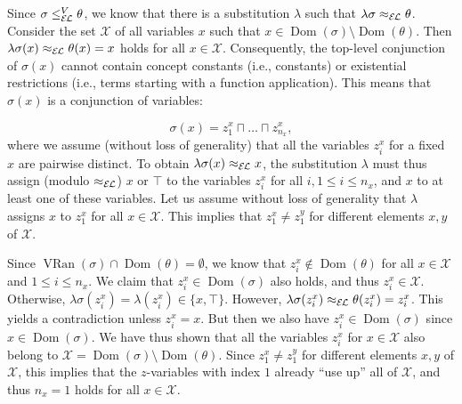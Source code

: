  
 
Since $\sigma\leq_{\mathcal{E\mkern-1.618muL}}^{V}\theta$, we know that there is a substitution $\lambda$ such that $\lambda\sigma\approx_{\mathcal{E\mkern-1.618muL}}\theta$. Consider the set $\mathcal{X}$ of all variables $x$ such that $x\in\operatorname{Dom}(\sigma)\setminus\operatorname{Dom}(\theta)$. Then $\lambda\sigma(x)\approx_{\mathcal{E\mkern-1.618muL}}\theta(x)=x$ holds for all $x\in\mathcal{X}$. Consequently, the top-level conjunction of $\sigma(x)$ cannot contain concept constants (i.e., constants) or existential restrictions (i.e., terms starting with a function application). This means that $\sigma(x)$ is a conjunction of variables:\par
    \[\sigma(x)=z_{1}^{x}\sqcap\ldots\sqcap z_{n_{x}}^{x},\]    
where we assume (without loss of generality) that all the variables $z_{i}^{x}$ for a fixed $x$ are pairwise distinct. To obtain $\lambda\sigma(x)\approx_{\mathcal{E\mkern-1.618muL}}x$, the substitution $\lambda$ must thus assign (modulo $\approx_{\mathcal{E\mkern-1.618muL}}$) $x$ or $\top$ to the variables $z_{i}^{x}$ for all $i,1\leq i\leq n_{x}$, and $x$ to at least one of these variables. Let us assume without loss of generality that $\lambda$ assigns $x$ to $z_{1}^{x}$ for all $x\in\mathcal{X}$. This implies that $z_{1}^{x}\neq z_{1}^{y}$ for different elements $x,y$ of $\mathcal{X}$.\par
 
 
 
Since $\operatorname{VRan}(\sigma)\cap\operatorname{Dom}(\theta)=\emptyset$, we know that $z_{i}^{x}\not\in\operatorname{Dom}(\theta)$ for all $x\in\mathcal{X}$ and $1\leq i\leq n_{x}$. We claim that $z_{i}^{x}\in\operatorname{Dom}(\sigma)$ also holds, and thus $z_{i}^{x}\in\mathcal{X}$. Otherwise, $\lambda\sigma(z_{i}^{x})=\lambda(z_{i}^{x})\in\{x,\top\}$. However, $\lambda\sigma(z_{i}^{x})\approx_{\mathcal{E\mkern-1.618muL}}\theta(z_{i}^{x})=%
z_{i}^{x}$. This yields a contradiction unless $z_{i}^{x}=x$. But then we also have $z_{i}^{x}\in\operatorname{Dom}(\sigma)$ since $x\in\operatorname{Dom}(\sigma)$. We have thus shown that all the variables $z_{i}^{x}$ for $x\in\mathcal{X}$ also belong to $\mathcal{X}=\operatorname{Dom}(\sigma)\setminus\operatorname{Dom}(\theta)$. Since $z_{1}^{x}\neq z_{1}^{y}$ for different elements $x,y$ of $\mathcal{X}$, this implies that the $z$-variables with index $1$ already “use up” all of $\mathcal{X}$, and thus $n_{x}=1$ holds for all $x\in\mathcal{X}$.\par
 
